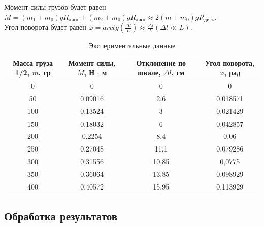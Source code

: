 \documentclass[a4paper]{article}
\begin{document}
Момент силы грузов будет равен $M = (m_{1}+m_{0})gR_{\text{диск}} + (m_{2}+m_{0})gR_{\text{диск}} \approx 2(m+m_{0})gR_{\text{диск}}$.\\
Угол поворота будет равен $\varphi = arctg(\frac{\Delta l}{L}) \approx \frac{\Delta l}{L} (\Delta l \ll L)$.

\begin{table}[h!]
\begin{center}
\begin{tabular}{|c|c|c|c|}
\hline
Масса груза 1/2, $m$, гр & Момент силы, $M$, Н $\cdot$ м & Отклонение по шкале, $\Delta l$, см & Угол поворота, $\varphi$, рад \\ \hline
0                        & 0                             & 0                                   & 0                             \\ \hline
50                       & 0,09016                       & 2,6                                 & 0,018571                      \\ \hline
100                      & 0,13524                       & 3                                   & 0,021429                      \\ \hline
150                      & 0,18032                       & 6                                   & 0,042857                      \\ \hline
200                      & 0,2254                        & 8,4                                 & 0,06                          \\ \hline
250                      & 0,27048                       & 11,1                                & 0,079286                      \\ \hline
300                      & 0,31556                       & 10,85                               & 0,0775                        \\ \hline
350                      & 0,36064                       & 13,85                               & 0,098929                      \\ \hline
400                      & 0,40572                       & 15,95                               & 0,113929                      \\ \hline
\end{tabular}
\caption{Экспериментальные данные}
\end{center}
\end{table}

\newpage
\subsection{Обработка результатов}
\end{document}
